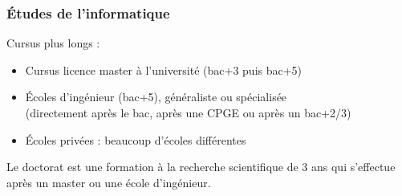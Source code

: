 \documentclass{beamer}
\begin{document}
\begin{frame}
    \frametitle{Études de l'informatique}
    Cursus plus longs :
        \begin{itemize}
            \item Cursus licence master à l'université (bac+3 puis bac+5)
            \item Écoles d'ingénieur (bac+5), généraliste ou spécialisée\\
            (directement après le bac, après une CPGE ou après un bac+2/3)
            \item Écoles privées : beaucoup d'écoles différentes
        \end{itemize}
        \medbreak
        Le doctorat est une formation à la recherche scientifique de 3 ans qui s'effectue après un master ou une école d'ingénieur.
\end{frame}
\end{document}
